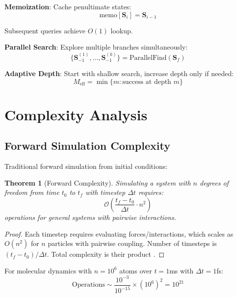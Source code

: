 \documentclass[twocolumn,10pt]{article}
\newtheorem{theorem}{Theorem}
\begin{document}
\textbf{Memoization}: Cache penultimate states:
\begin{equation}
\text{memo}[\mathbf{S}_i] = \mathbf{S}_{i-1}
\end{equation}

Subsequent queries achieve $O(1)$ lookup.

\textbf{Parallel Search}: Explore multiple branches simultaneously:
\begin{equation}
\{\mathbf{S}_{-1}^{(1)}, \ldots, \mathbf{S}_{-1}^{(k)}\} = \text{ParallelFind}(\mathbf{S}_f)
\end{equation}

\textbf{Adaptive Depth}: Start with shallow search, increase depth only if needed:
\begin{equation}
M_{\text{eff}} = \min\{m : \text{success at depth } m\}
\end{equation}

\section{Complexity Analysis}

\subsection{Forward Simulation Complexity}

Traditional forward simulation from initial conditions:

\begin{theorem}[Forward Complexity]
Simulating a system with $n$ degrees of freedom from time $t_0$ to $t_f$ with timestep $\Delta t$ requires:
\begin{equation}
\mathcal{O}\left(\frac{t_f - t_0}{\Delta t} \cdot n^2\right)
\end{equation}
operations for general systems with pairwise interactions.
\end{theorem}

\begin{proof}
Each timestep requires evaluating forces/interactions, which scales as $O(n^2)$ for $n$ particles with pairwise coupling. Number of timesteps is $(t_f - t_0)/\Delta t$. Total complexity is their product \cite{Frenkel2001}.
\end{proof}

For molecular dynamics with $n = 10^6$ atoms over $t = 1$ms with $\Delta t = 1$fs:
\begin{equation}
\text{Operations} \sim \frac{10^{-3}}{10^{-15}} \times (10^6)^2 = 10^{21}
\end{equation}
\end{document}
